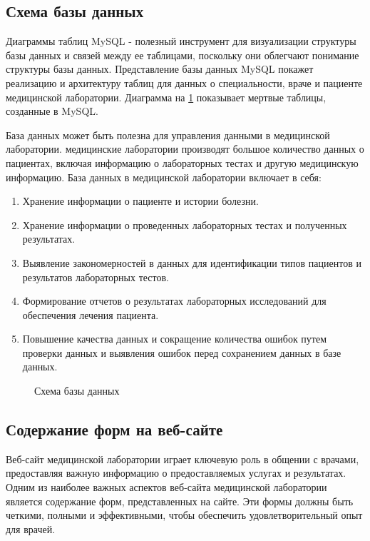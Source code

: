 \subsection{Схема базы данных}

Диаграммы таблиц MySQL - полезный инструмент для визуализации структуры базы данных и связей между ее таблицами, поскольку они облегчают понимание структуры базы данных. Представление базы данных MySQL покажет реализацию и архитектуру таблиц для данных о специальности, враче и пациенте медицинской лаборатории.
Диаграмма на \ref{image:base} показывает мертвые таблицы, созданные в MySQL.

База данных может быть полезна для управления данными в медицинской лаборатории. медицинские лаборатории производят большое количество данных о пациентах, включая информацию о лабораторных тестах и другую медицинскую информацию. База данных в медицинской лаборатории включает в себя:

\begin{enumerate}
	\item Хранение информации о пациенте и истории болезни.
	\item Хранение информации о проведенных лабораторных тестах и полученных результатах.
	\item Выявление закономерностей в данных для идентификации типов пациентов и результатов лабораторных тестов.
	\item Формирование отчетов о результатах лабораторных исследований для обеспечения лечения пациента.
	\item Повышение качества данных и сокращение количества ошибок путем проверки данных и выявления ошибок перед сохранением данных в базе данных.
\end{enumerate}

\begin{figure}
	\caption{Схема базы данных}
	\label{image:base}
\end{figure}

\subsection{Содержание форм на веб-сайте}

Веб-сайт медицинской лаборатории играет ключевую роль в общении с врачами, предоставляя важную информацию о предоставляемых услугах и результатах. Одним из наиболее важных аспектов веб-сайта медицинской лаборатории является содержание форм, представленных на сайте. Эти формы должны быть четкими, полными и эффективными, чтобы обеспечить удовлетворительный опыт для врачей.

